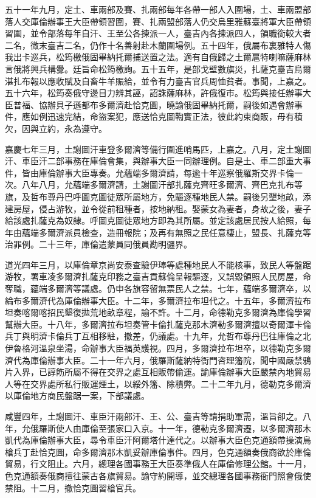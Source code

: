 \begin{pinyinscope}
五十一年九月，定土、車兩部及賽、扎兩部每年各帶一部人入圍場，土、車兩盟部落人交庫倫辦事王大臣帶領習圍，賽、扎兩盟部落人仍交烏里雅蘇臺將軍大臣帶領習圍，並令部落每年自汗、王至公各揀派一人，臺吉內各揀派四人，領職銜較大者二名，微末臺吉二名，仍作十名善射赴木蘭圍場例。五十四年，俄屬布裏雅特人傷我出卡巡兵，松筠檄俄固畢納托爾捕送置之法。適有自俄歸之土爾扈特喇嘛薩麻林言俄將興兵構釁。廷旨命松筠檄詢。五十五年，是部戈壁數旗災，扎薩克臺吉烏爾湛扎布報以應收賦及自畜牛羊賑給，並令有力臺吉官兵周恤貧者。事聞，上嘉之。五十六年，松筠奏俄守邊目力辨其誣，詔誅薩麻林，許俄復市。松筠與接任辦事大臣普福、協辦貝子遜都布多爾濟赴恰克圖，曉諭俄固畢納托爾，嗣後如遇會辦事件，應如例迅速完結，命盜案犯，應送恰克圖鞫實正法，彼此約束商販，毋有積欠，因與立約，永為遵守。

嘉慶七年三月，土謝圖汗車登多爾濟等備行圍進哨馬匹，上嘉之。八月，定土謝圖汗、車臣汗二部事務在庫倫會集，與辦事大臣一同辦理例。自是土、車二部重大事件，皆由庫倫辦事大臣專奏。允蘊端多爾濟請，每逾十年巡察俄羅斯交界卡倫一次。八年八月，允蘊端多爾濟請，土謝圖汗部扎薩克齊旺多爾濟、齊巴克扎布等旗，及哲布尊丹巴呼圖克圖徒眾所屬地方，免驅逐種地民人禁。嗣後另墾地畝，添建房屋，侵占游牧，並令從前租種者，按地納租。娶蒙女為妻者，身故之後，妻子給該處扎薩克為奴隸。呼圖克圖徒眾地方即為其所屬。並定該處居民按人給照，每年由蘊端多爾濟派員檢查，造冊報院；及再有無照之民任意棲止，盟長、扎薩克等治罪例。二十三年，庫倫遣蒙員同俄員勘明疆界。

道光四年三月，以庫倫章京尚安泰查驗伊琫等處種地民人不能核事，致民人等盤踞游牧，署車凌多爾濟扎薩克印務之臺吉貢蘇倫呈報驅逐，又誤毀領照人民房屋，命奪職，蘊端多爾濟等議處。仍申各旗容留無票民人之禁。七年，蘊端多爾濟卒，以綸布多爾濟代為庫倫辦事大臣。十二年，多爾濟拉布坦代之。十五年，多爾濟拉布坦奏喀爾喀招民墾復拋荒地畝章程，諭不許。十二月，命德勒克多爾濟為庫倫學習幫辦大臣。十八年，多爾濟拉布坦奏管卡倫扎薩克那木濟勒多爾濟擅以奇爾渾卡倫兵丁與明濟卡倫兵丁互相移駐，撤差，仍議處。十九年，允哲布尊丹巴往庫倫之北伊魯格河溫泉坐湯，命辦事大臣福英護視。四月，多爾濟拉布坦卒，以德勒克多爾濟代為庫倫辦事大臣。二十一年六月，俄羅斯薩納特衙門咨理籓院，聞中國嚴禁鴉片入界，已諄飭所屬不得在交界之處互相販帶偷運。諭庫倫辦事大臣嚴禁內地貿易人等在交界處所私行販運煙土，以綏外籓、除積弊。二十二年九月，德勒克多爾濟以庫倫地方商民盤踞一案，下部議處。

咸豐四年，土謝圖汗、車臣汗兩部汗、王、公、臺吉等請捐助軍需，溫旨卻之。八年，允俄羅斯使人由庫倫至張家口入京。十一年，德勒克多爾濟遷，以多爾濟那木凱代為庫倫辦事大臣，尋令車臣汗阿爾塔什達代之。以辦事大臣色克通額帶操演鳥槍兵丁赴恰克圖，命多爾濟那木凱妥辦庫倫事件。四月，色克通額奏俄商欲於庫倫貿易，行文阻止。六月，總理各國事務王大臣奏準俄人在庫倫修理公館。十一月，色克通額奏俄商擅往蒙古各旗貿易。諭守約開導，並交總理各國事務衙門照會俄使禁阻。十二月，撤恰克圖習槍官兵。


\end{pinyinscope}
